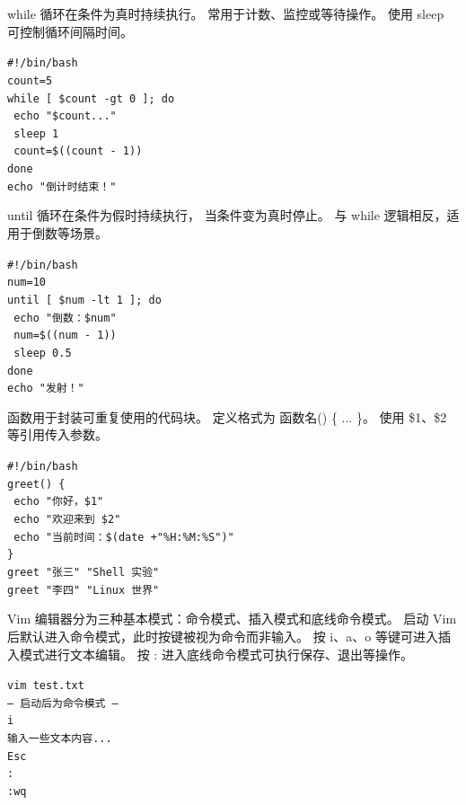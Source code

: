 \documentclass[a4paper, 12pt]{article}
\begin{document}
\begin{tcolorbox}[instancestyle, title=实例12：while循环计数]
while 循环在条件为真时持续执行。
常用于计数、监控或等待操作。
使用 sleep 可控制循环间隔时间。

\texttt{\#!/bin/bash} \\
\texttt{count=5} \\
\texttt{while [ \$count -gt 0 ]; do} \\
\texttt{  echo "\$count..."} \\
\texttt{  sleep 1} \\
\texttt{  count=\$((count - 1))} \\
\texttt{done} \\
\texttt{echo "倒计时结束！"}
\end{tcolorbox}

\begin{tcolorbox}[instancestyle, title=实例13：until循环使用]
until 循环在条件为假时持续执行，
当条件变为真时停止。
与 while 逻辑相反，适用于倒数等场景。

\texttt{\#!/bin/bash} \\
\texttt{num=10} \\
\texttt{until [ \$num -lt 1 ]; do} \\
\texttt{  echo "倒数：\$num"} \\
\texttt{  num=\$((num - 1))} \\
\texttt{  sleep 0.5} \\
\texttt{done} \\
\texttt{echo "发射！"}
\end{tcolorbox}

\begin{tcolorbox}[instancestyle, title=实例14：函数定义与调用]
函数用于封装可重复使用的代码块。
定义格式为 函数名() \{ ... \}。
使用 \$1、\$2 等引用传入参数。

\texttt{\#!/bin/bash} \\
\texttt{greet() \{} \\
\texttt{  echo "你好，\$1"} \\
\texttt{  echo "欢迎来到 \$2"} \\
\texttt{  echo "当前时间：\$(date +"\%H:\%M:\%S")"} \\
\texttt{\}} \\
\texttt{greet "张三" "Shell 实验"} \\
\texttt{greet "李四" "Linux 世界"}
\end{tcolorbox}

\begin{tcolorbox}[instancestyle, title=实例15：Vim的三种基本模式]
Vim 编辑器分为三种基本模式：命令模式、插入模式和底线命令模式。
启动 Vim 后默认进入命令模式，此时按键被视为命令而非输入。
按 i、a、o 等键可进入插入模式进行文本编辑。
按 : 进入底线命令模式可执行保存、退出等操作。

\texttt{vim test.txt} \\
\texttt{--- 启动后为命令模式 ---} \\
\texttt{i} \\
\texttt{输入一些文本内容...} \\
\texttt{Esc} \\
\texttt{:} \\
\texttt{:wq}
\end{tcolorbox}
\end{document}
